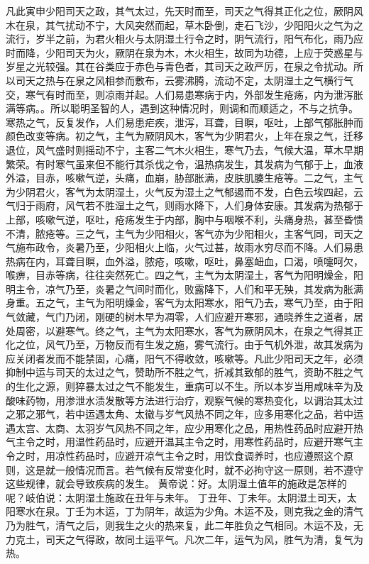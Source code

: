 \documentclass[a4paper,12pt,UTF8,twoside]{ctexbook}
\begin{document}
凡此寅申少阳司天之政，其气太过，先天时而至，司天之气得其正化之位，厥阴风木在泉，其气扰动不宁，大风突然而起，草木卧倒，走石飞沙，少阳阳火之气为之流行，岁半之前，为君火相火与太阴湿土行令之时，阴气流行，阳气布化，雨乃应时而降，少阳司天为火，厥阴在泉为木，木火相生，故同为功德，上应于荧惑星与岁星之光较强。其在谷类应于赤色与青色者，其司天之政严厉，在泉之令扰动。所以司天之热与在泉之风相参而敷布，云雾沸腾，流动不定，太阴湿土之气横行气交，寒气有时而至，则凉雨并起。人们易患寒病于内，外部发生疮疡，内为泄泻胀满等病。。所以聪明圣智的人，遇到这种情况时，则调和而顺适之，不与之抗争。寒热之气，反复发作，人们易患疟疾，泄泻，耳聋，目瞑，呕吐，上部气郁胀肿而颜色改变等病。初之气，主气为厥阴风木，客气为少阴君火，上年在泉之气，迁移退位，风气盛时则摇动不宁，主客二气木火相生，寒气乃去，气候大温，草木早期繁荣。有时寒气虽来但不能行其杀伐之令，温热病发生，其发病为气郁于上，血液外溢，目赤，咳嗽气逆，头痛，血崩，胁部胀满，皮肤肌腠生疮等。二之气，主气为少阴君火，客气为太阴湿土，火气反为湿土之气郁遏而不发，白色云埃四起，云气归于雨府，风气若不胜湿土之气，则雨水降下，人们身体安康。其发病为热郁于上部，咳嗽气逆，呕吐，疮疡发生于内部，胸中与咽喉不利，头痛身热，甚至昏愦不清，脓疮等。三之气，主气为少阳相火，客气亦为少阳相火，主客气同，司天之气施布政令，炎暑乃至，少阳相火上临，火气过甚，故雨水穷尽而不降。人们易患热病在内，耳聋目瞑，血外溢，脓疮，咳嗽，呕吐，鼻塞衄血，口渴，喷嚏呵欠，喉痹，目赤等病，往往突然死亡。四之气，主气为太阴湿土，客气为阳明燥金，阳明主令，凉气乃至，炎暑之气间时而化，败露降下，人们和平无殃，其发病为胀满身重。五之气，主气为阳明燥金，客气为太阳寒水，阳气乃去，寒气乃至，由于阳气敛藏，气门乃闭，刚硬的树木早为凋零，人们应避开寒邪，通晓养生之道者，居处周密，以避寒气。终之气，主气为太阳寒水，客气为厥阴风木，在泉之气得其正化之位，风气乃至，万物反而有生发之施，雾气流行。由于气机外泄，故其发病为应关闭者发而不能禁固，心痛，阳气不得收敛，咳嗽等。凡此少阳司天之年，必须抑制中运与司天的太过之气，赞助所不胜之气，折减其致郁的胜气，资助不胜之气的生化之源，则猝暴太过之气不能发生，重病可以不生。所以本岁当用咸味辛为及酸味药物，用渗泄水渍发散等方法进行治疗，观察气候的寒热变化，以调治其太过之邪之邪气，若中运遇太角、太徽与岁气风热不同之年，应多用寒化之品，若中运遇太宫、太商、太羽岁气风热不同之年，应少用寒化之品，用热性药品时应避开热气主令之时，用温性药品时，应避开温其主令之时，用寒性药品时，应避开寒气主令之时，用凉性药品时，应避开凉气主令之时，用饮食调养时，也应遵照这个原则，这是就一般情况而言。若气候有反常变化时，就不必拘守这一原则，若不遵守这些规律，就会导致疾病的发生。
黄帝说：好。太阴湿土值年的施政是怎样的呢？岐伯说：太阴湿土施政在丑年与未年。
丁丑年、丁未年。太阴湿土司天，太阳寒水在泉。丁壬为木运，丁为阴年，故运为少角。木运不及，则克我之金的清气乃为胜气，清气之后，则我生之火的热来复，此二年胜负之气相同。木运不及，无力克土，司天之气得政，故同土运平气。凡次二年，运气为风，胜气为清，复气为热。
\end{document}
